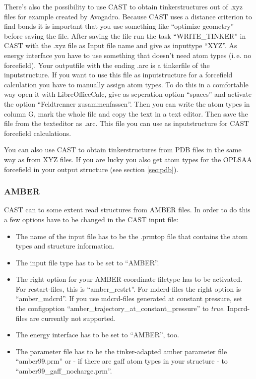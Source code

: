 \documentclass[10pt,a4paper]{article} %
\begin{document}
	There's also the possibility to use CAST to obtain tinkerstructures out of .xyz files for example created by Avogadro. Because CAST uses a distance criterion to find bonds it is important that you use something like ``optimize geometry'' before saving the file. After saving the file run the task ``WRITE\_TINKER'' in CAST with the .xyz file as Input file name and give as inputtype ``XYZ''. As energy interface you have to use something that doesn't need atom types (i.\,e. no forcefield). Your outputfile with the ending .arc is a tinkerfile of the inputstructure. If you want to use this file as inputstructure for a forcefield calculation you have to manually assign atom types. To do this in a comfortable way open it with LibreOfficeCalc, give as seperation option ``spaces'' and activate the option ``Feldtrenner zusammenfassen''. Then you can write the atom types in column G, mark the whole file and copy the text in a text editor. Then save the file from the texteditor as .arc. This file you can use as inputstructure for CAST forcefield calculations.
	
	You can also use CAST to obtain tinkerstructures from PDB files in the same way as from XYZ files. If you are lucky you also get atom types for the OPLSAA forcefield in your output structure (see section \ref{sec:pdb}).
	
	\subsubsection{AMBER}

\ac{CAST} can to some extent read structures from \ac{AMBER} files. In order to do this a few options have to be changed in the CAST input file:
\begin{itemize}
\item The name of the input file has to be the .prmtop file that contains the atom types and structure information.
\item The input file type has to be set to ``AMBER''.
\item The right option for your AMBER coordinate filetype has to be activated. For restart-files, this is ``amber\_restrt''. For mdcrd-files the right option is ``amber\_mdcrd''. If you use mdcrd-files generated at constant pressure, set the configoption ``amber\_trajectory\_at\_constant\_pressure'' to \textit{true}. Inpcrd-files are currently not supported.
\item The energy interface has to be set to ``AMBER'', too.
\item The parameter file has to be the tinker-adapted amber parameter file ``amber99.prm'' or - if there are gaff atom types in your structure - to ``amber99\_gaff\_nocharge.prm''.
\end{itemize}
\end{document}
